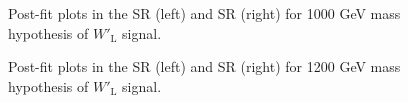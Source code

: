 \begin{figure}[H]
  \centering
  \caption{Post-fit plots in the SR (left) and SR (right) for 1000 GeV mass hypothesis of $W'_{\text{L}}$ signal.}
  \label{fig:Postfit_WpLH1000_Asimov}
\end{figure}
\begin{figure}[H]
  \centering
  \caption{Post-fit plots in the SR (left) and SR (right) for 1200 GeV mass hypothesis of $W'_{\text{L}}$ signal.}
  \label{fig:Postfit_WpLH1200_Asimov}
\end{figure}
